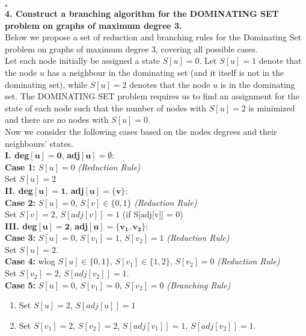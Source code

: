\documentclass{article}
\begin{document}
\hfill \ensuremath{\square} \\

\noindent
\textbf{4. Construct a branching algorithm for the DOMINATING SET problem on graphs of maximum degree 3.} \\

Below we propose a set of reduction and branching rules for the Dominating Set problem on graphs of maximum degree 3, covering all possible cases. \\

Let each node initially be assigned a state $S[u] = 0$. Let $S[u] = 1$ denote that the node $u$ has a neighbour in the dominating set (and it itself is not in the dominating set), while $S[u] = 2$ denotes that the node $u$ is in the dominating set. The DOMINATING SET problem requires us to find an assignment for the state of each node such that the number of nodes with $S[u] = 2$ is minimized and there are no nodes with $S[u] = 0$. \\

Now we consider the following cases based on the nodes degrees and their neighbours' states. \\

\noindent
\textbf{I. deg}$\mathbf{[u] = 0}$, \textbf{adj}$\mathbf{[u] = \emptyset}$: \\
\textbf{Case 1:} $S[u] = 0$ \textit{(Reduction Rule)} \\
\hspace*{2em} Set $S[u] = 2$ \\

\noindent
\textbf{II. deg}$\mathbf{[u] = 1}$, \textbf{adj}$\mathbf{[u] = \{v\}}$: \\
\textbf{Case 2:} $S[u] = 0$, $S[v] \in \{0, 1\}$ \textit{(Reduction Rule)} \\
\hspace*{2em} Set $S[v] = 2$, $S[adj[v]] = 1$ (if S[adj[v]] = 0) \\

\noindent
\textbf{III. deg}$\mathbf{[u] = 2}$, \textbf{adj}$\mathbf{[u] = \{v_1, v_2\}}$: \\
\textbf{Case 3:} $S[u] = 0$, $S[v_1] = 1$, $S[v_2] = 1$ \textit{(Reduction Rule)} \\
\hspace*{2em} Set $S[u] = 2$. \\
\textbf{Case 4:} wlog $S[u] \in \{0, 1\}$, $S[v_1] \in \{1, 2\}$, $S[v_2] = 0$ \textit{(Reduction Rule)} \\
\hspace*{2em} Set $S[v_2] = 2$, $S[adj[v_2]] = 1$. \\
\textbf{Case 5:} $S[u] = 0$, $S[v_1] = 0$, $S[v_2] = 0$ \textit{(Branching Rule)} \vspace*{-1ex}
\begin{enumerate}[label=(\alph*)]
    \itemindent2em
    \itemsep0em
    \item Set $S[u] = 2$, $S[adj[u]] = 1$
    \item Set $S[v_1] = 2$, $S[v_2] = 2$, $S[adj[v_1]] = 1$, $S[adj[v_2]] = 1$.
\end{enumerate} \vspace*{1ex}
\end{document}
